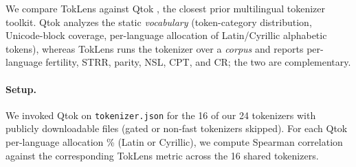 \documentclass[11pt]{article}
\begin{document}
We compare TokLens against Qtok \citep{chelombitko2024qtok}, the closest prior multilingual tokenizer toolkit. Qtok analyzes the static \emph{vocabulary} (token-category distribution, Unicode-block coverage, per-language allocation of Latin/Cyrillic alphabetic tokens), whereas TokLens runs the tokenizer over a \emph{corpus} and reports per-language fertility, STRR, parity, NSL, CPT, and CR; the two are complementary.

\paragraph{Setup.} We invoked Qtok on \texttt{tokenizer.json} for the 16 of our 24 tokenizers with publicly downloadable files (gated or non-fast tokenizers skipped). For each Qtok per-language allocation \% (Latin or Cyrillic), we compute Spearman correlation against the corresponding TokLens metric across the 16 shared tokenizers.

\begin{table}[H]
\centering
\small
{}
\caption{Feature matrix comparing Qtok and TokLens.}
\label{tab:qtok_features}
\end{table}
\end{document}
